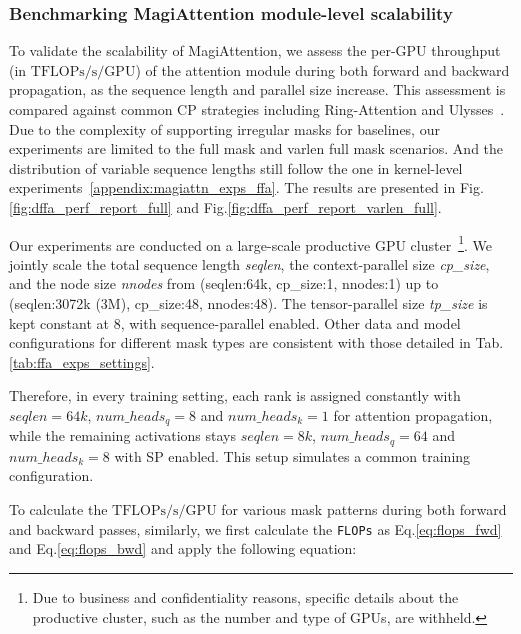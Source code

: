 






\clearpage

\subsubsection{Benchmarking MagiAttention module-level scalability}\label{appendix:magiattn_exps_dffa}

To validate the scalability of MagiAttention, we assess the per-GPU throughput (in $\mathrm{TFLOPs/s/GPU}$) of the attention module during both forward and backward propagation, as the sequence length and parallel size increase. This assessment is compared against common CP strategies including Ring-Attention and Ulysses~\citep{liu2023ringattentionblockwisetransformers, jacobs2023deepspeed}. Due to the complexity of supporting irregular masks for baselines, our experiments are limited to the full mask and varlen full mask scenarios. And the distribution of variable sequence lengths still follow the one in kernel-level experiments~\ref{appendix:magiattn_exps_ffa}. The results are presented in Fig.\ref{fig:dffa_perf_report_full} and Fig.\ref{fig:dffa_perf_report_varlen_full}.

Our experiments are conducted on a large-scale productive GPU cluster~\footnote{Due to business and confidentiality reasons, specific details about the productive cluster, such as the number and type of GPUs, are withheld.}. We jointly scale the total sequence length \textit{seqlen}, the context-parallel size \textit{cp\_size}, and the node size \textit{nnodes} from (seqlen:64k, cp\_size:1, nnodes:1) up to (seqlen:3072k (3M), cp\_size:48, nnodes:48). The tensor-parallel size \textit{tp\_size} is kept constant at 8, with sequence-parallel enabled. Other data and model configurations for different mask types are consistent with those detailed in Tab.\ref{tab:ffa_exps_settings}.

Therefore, in every training setting, each rank is assigned constantly with $seqlen=64k$, $num\_heads_q = 8$ and $num\_heads_k = 1$ for attention propagation, while the remaining activations stays $seqlen=8k$, $num\_heads_q = 64$ and $num\_heads_k = 8$ with SP enabled. This setup simulates a common training configuration.

To calculate the $\mathrm{TFLOPs/s/GPU}$ for various mask patterns during both forward and backward passes, similarly, we first calculate the \texttt{FLOPs} as Eq.\ref{eq:flops_fwd} and Eq.\ref{eq:flops_bwd} and apply the following equation:

